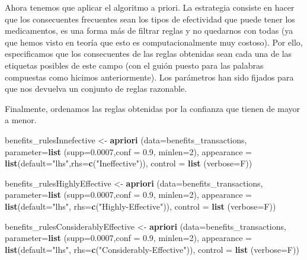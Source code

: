 \documentclass[spanish,]{article}
\newenvironment{Shaded}{\begin{snugshade}}{\end{snugshade}}
\newcommand{\KeywordTok}[1]{\textcolor[rgb]{0.13,0.29,0.53}{\textbf{#1}}}
\newcommand{\DataTypeTok}[1]{\textcolor[rgb]{0.13,0.29,0.53}{#1}}
\newcommand{\DecValTok}[1]{\textcolor[rgb]{0.00,0.00,0.81}{#1}}
\newcommand{\FloatTok}[1]{\textcolor[rgb]{0.00,0.00,0.81}{#1}}
\newcommand{\StringTok}[1]{\textcolor[rgb]{0.31,0.60,0.02}{#1}}
\newcommand{\NormalTok}[1]{#1}
\begin{document}
Ahora tenemos que aplicar el algoritmo a priori. La estrategia consiste
en hacer que los consecuentes frecuentes sean los tipos de efectividad
que puede tener los medicamentos, es una forma más de filtrar reglas y
no quedarnos con todas (ya que hemos visto en teoría que esto es
computacionalmente muy costoso). Por ello, especificamos que los
consecuentes de las reglas obtenidas sean cada una de las etiquetas
posibles de este campo (con el guión puesto para las palabras compuestas
como hicimos anteriormente). Los parámetros han sido fijados para que
nos devuelva un conjunto de reglas razonable.

Finalmente, ordenamos las reglas obtenidas por la confianza que tienen
de mayor a menor.

\begin{Shaded}
\begin{Highlighting}[]
\NormalTok{benefits_rulesInnefective <-}\StringTok{ }\KeywordTok{apriori}\NormalTok{ (}\DataTypeTok{data=}\NormalTok{benefits_transactions, }
                             \DataTypeTok{parameter=}\KeywordTok{list}\NormalTok{ (}\DataTypeTok{supp=}\FloatTok{0.0007}\NormalTok{,}\DataTypeTok{conf =} \FloatTok{0.9}\NormalTok{, }\DataTypeTok{minlen=}\DecValTok{2}\NormalTok{), }
                             \DataTypeTok{appearance =} \KeywordTok{list}\NormalTok{(}\DataTypeTok{default=}\StringTok{"lhs"}\NormalTok{,}\DataTypeTok{rhs=}\KeywordTok{c}\NormalTok{(}\StringTok{"Ineffective"}\NormalTok{)), }
                             \DataTypeTok{control =} \KeywordTok{list}\NormalTok{ (}\DataTypeTok{verbose=}\NormalTok{F))}

\NormalTok{benefits_rulesHighlyEffective <-}\StringTok{ }\KeywordTok{apriori}\NormalTok{ (}\DataTypeTok{data=}\NormalTok{benefits_transactions, }
                             \DataTypeTok{parameter=}\KeywordTok{list}\NormalTok{ (}\DataTypeTok{supp=}\FloatTok{0.0007}\NormalTok{,}\DataTypeTok{conf =} \FloatTok{0.9}\NormalTok{, }\DataTypeTok{minlen=}\DecValTok{2}\NormalTok{), }
                             \DataTypeTok{appearance =} \KeywordTok{list}\NormalTok{(}\DataTypeTok{default=}\StringTok{"lhs"}\NormalTok{,}
                                               \DataTypeTok{rhs=}\KeywordTok{c}\NormalTok{(}\StringTok{"Highly-Effective"}\NormalTok{)), }
                             \DataTypeTok{control =} \KeywordTok{list}\NormalTok{ (}\DataTypeTok{verbose=}\NormalTok{F))}

\NormalTok{benefits_rulesConsiderablyEffective <-}\StringTok{ }\KeywordTok{apriori}\NormalTok{ (}\DataTypeTok{data=}\NormalTok{benefits_transactions, }
                              \DataTypeTok{parameter=}\KeywordTok{list}\NormalTok{ (}\DataTypeTok{supp=}\FloatTok{0.0007}\NormalTok{,}\DataTypeTok{conf =} \FloatTok{0.9}\NormalTok{, }\DataTypeTok{minlen=}\DecValTok{2}\NormalTok{), }
                              \DataTypeTok{appearance =} \KeywordTok{list}\NormalTok{(}\DataTypeTok{default=}\StringTok{"lhs"}\NormalTok{,}
                                                \DataTypeTok{rhs=}\KeywordTok{c}\NormalTok{(}\StringTok{"Considerably-Effective"}\NormalTok{)), }
                              \DataTypeTok{control =} \KeywordTok{list}\NormalTok{ (}\DataTypeTok{verbose=}\NormalTok{F))}


\end{Highlighting}
\end{Shaded}
\end{document}
